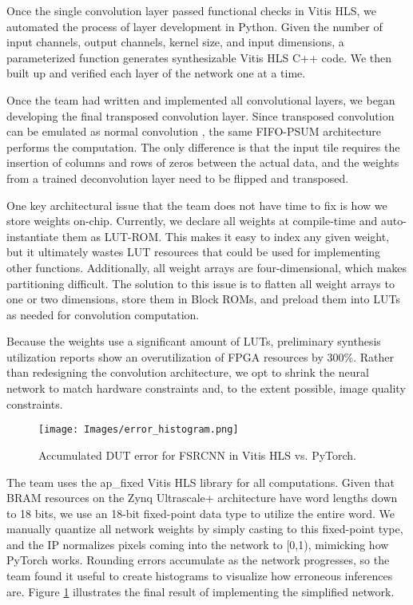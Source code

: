 \documentclass{article}
\begin{document}
            \par Once the single convolution layer passed functional checks in Vitis HLS, we automated the process of layer development in Python. Given the number of input channels, output channels, kernel size, and input dimensions, a parameterized function generates synthesizable Vitis HLS C++ code. We then built up and verified each layer of the network one at a time. 
            \par Once the team had written and implemented all convolutional layers, we began developing the final transposed convolution layer. Since transposed convolution can be emulated as normal convolution \cite{dumoulin_guide_2016}, the same FIFO-PSUM architecture performs the computation. The only difference is that the input tile requires the insertion of columns and rows of zeros between the actual data, and the weights from a trained deconvolution layer need to be flipped and transposed.

            \par One key architectural issue that the team does not have time to fix is how we store weights on-chip. Currently, we declare all weights at compile-time and auto-instantiate them as LUT-ROM. This makes it easy to index any given weight, but it ultimately wastes LUT resources that could be used for implementing other functions. Additionally, all weight arrays are four-dimensional, which makes partitioning difficult. The solution to this issue is to flatten all weight arrays to one or two dimensions, store them in Block ROMs, and preload them into LUTs as needed for convolution computation.

            \par Because the weights use a significant amount of LUTs, preliminary synthesis utilization reports show an overutilization of FPGA resources by 300\%. Rather than redesigning the convolution architecture, we opt to shrink the neural network to match hardware constraints and, to the extent possible, image quality constraints.
            \begin{figure}[!tb] 
                \centering
                \texttt{[image: Images/error\_histogram.png]} 
                \caption{Accumulated DUT error for FSRCNN in Vitis HLS vs. PyTorch.} 
                \label{fig:fsrcnn_error_historgram} 
            \end{figure}
            \par The team uses the ap\_fixed Vitis HLS library for all computations. Given that BRAM resources on the Zynq Ultrascale+ architecture have word lengths down to 18 bits, we use an 18-bit fixed-point data type to utilize the entire word. We manually quantize all network weights by simply casting to this fixed-point type, and the IP normalizes pixels coming into the network to [0,1), mimicking how PyTorch works. Rounding errors accumulate as the network progresses, so the team found it useful to create histograms to visualize how erroneous inferences are. Figure \ref{fig:fsrcnn_error_historgram} illustrates the final result of implementing the simplified network.
            
\end{document}
